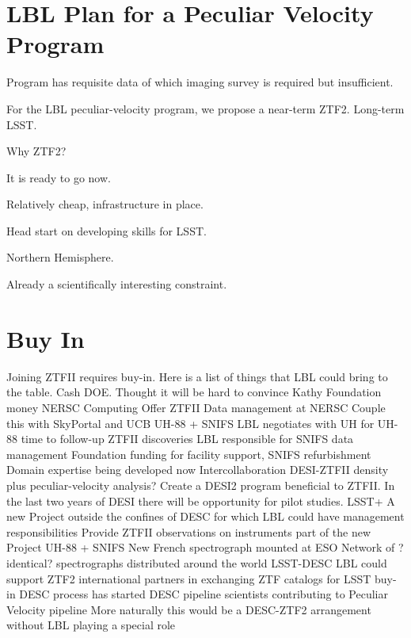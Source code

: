\documentclass[11pt, oneside]{article}   	%
\begin{document}

\section{LBL Plan for a Peculiar Velocity Program}
Program has requisite data of which imaging survey is required but insufficient.

For the LBL peculiar-velocity program, we propose a near-term ZTF2.  Long-term LSST.

Why ZTF2?


It is ready to go now.

Relatively cheap, infrastructure in place.

Head start on developing skills for LSST.

Northern Hemisphere.

Already a scientifically interesting constraint.


\section{Buy In}



Joining ZTFII requires buy-in.  Here is a list of things that LBL could bring to the table.
Cash
DOE.  Thought it will be hard to convince Kathy
Foundation money
NERSC Computing
Offer ZTFII Data management at NERSC
Couple this with SkyPortal and UCB
UH-88 + SNIFS
LBL negotiates with UH for UH-88 time to follow-up ZTFII discoveries
LBL responsible for SNIFS data management
Foundation funding for facility support, SNIFS refurbishment
Domain expertise being developed now
Intercollaboration DESI-ZTFII density plus peculiar-velocity analysis?
Create a DESI2 program beneficial to ZTFII.   In the last two years of DESI there will be opportunity for pilot studies.
LSST+
A new Project outside the confines of DESC for which LBL could have management responsibilities
Provide ZTFII observations on instruments part of the new Project
UH-88 + SNIFS
New French spectrograph mounted at ESO
Network of ?identical? spectrographs distributed around the world
LSST-DESC
LBL could support ZTF2 international partners in exchanging ZTF catalogs for LSST buy-in
DESC process has started
DESC pipeline scientists contributing to Peculiar Velocity pipeline
More naturally this would be a DESC-ZTF2 arrangement without LBL playing a special role
\end{document}
